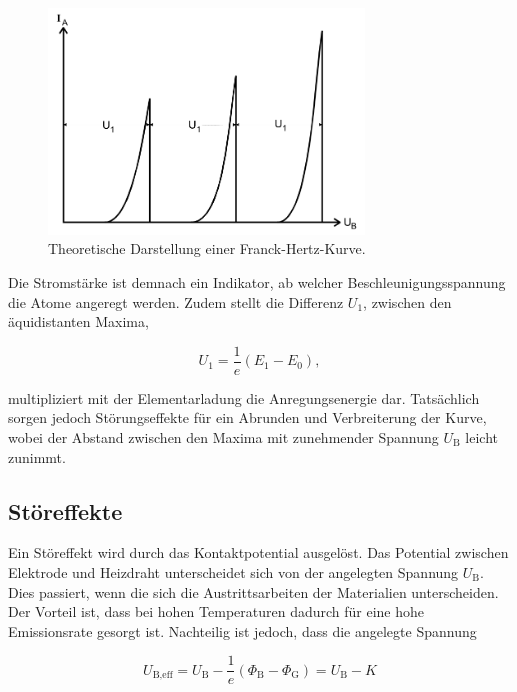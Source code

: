 \begin{figure}[H]
  \centering
  \includegraphics[height=6cm]{ressources/kurve1.png}
  \caption{Theoretische Darstellung einer Franck-Hertz-Kurve. \cite{skript}}
  \label{fig:2}
\end{figure}

Die Stromstärke ist demnach ein Indikator, ab welcher Beschleunigungsspannung die Atome angeregt werden.
Zudem stellt die Differenz $U_1$, zwischen den äquidistanten Maxima,

\begin{equation}
  U_1 = \frac{1}{e}(E_1-E_0), \label{eqn:5}
\end{equation}

multipliziert mit der Elementarladung die Anregungsenergie dar.
Tatsächlich sorgen jedoch Störungseffekte für ein Abrunden und Verbreiterung der Kurve, wobei der Abstand zwischen den Maxima mit zunehmender Spannung $U_{\text{B}}$ leicht zunimmt.

\subsection{Störeffekte}

Ein Störeffekt wird durch das Kontaktpotential ausgelöst.
Das Potential zwischen Elektrode und Heizdraht unterscheidet sich von der angelegten Spannung $U_{\text{B}}$.
Dies passiert, wenn die sich die Austrittsarbeiten der Materialien unterscheiden.
Der Vorteil ist, dass bei hohen Temperaturen dadurch für eine hohe Emissionsrate gesorgt ist.
Nachteilig ist jedoch, dass die angelegte Spannung

\begin{equation}
  U_{\text{B,eff}} = U_{\text{B}} - \frac{1}{e}(\Phi_{\text{B}} - \Phi_{\text{G}}) = U_{\text{B}} - K \label{eqn:6}
\end{equation}

